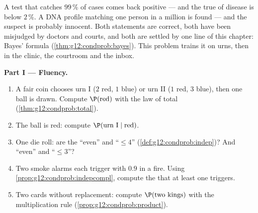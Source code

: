 \begin{problem}
\label{pb:g12:condprob:1}
A test that catches $99\,\%$ of cases comes back positive ---
and the true  of disease is below $2\,\%$. A DNA
profile matching one person in a million is found --- and the
suspect is probably innocent. Both statements are correct, both
have been misjudged by doctors and courts, and both are settled
by one line of this chapter: Bayes' formula
(\cref{thm:g12:condprob:bayes}). This problem trains it on urns,
then in the clinic, the courtroom and the inbox.

\medskip
\noindent\textbf{Part I --- Fluency.}
\begin{enumerate}
  \item A fair coin chooses urn I ($2$ red, $1$ blue) or urn II
        ($1$ red, $3$ blue), then one ball is drawn. Compute
        $\P(\text{red})$ with the law of total 
        (\cref{thm:g12:condprob:total}).
  \item The ball is red: compute $\P(\text{urn I} \mid
        \text{red})$.
  \item One die roll: are the  ``even'' and
        ``$\leq 4$'' 
        (\cref{def:g12:condprob:indep})? And ``even'' and
        ``$\leq 3$''?
  \item Two  smoke alarms each trigger with
         $0.9$ in a fire. Using
        \cref{prop:g12:condprob:indepcompl}, compute the
         that at least one triggers.
  \item Two cards without replacement: compute
        $\P(\text{two kings})$ with the multiplication rule
        (\cref{prop:g12:condprob:product}).
\end{enumerate}


\end{problem}
